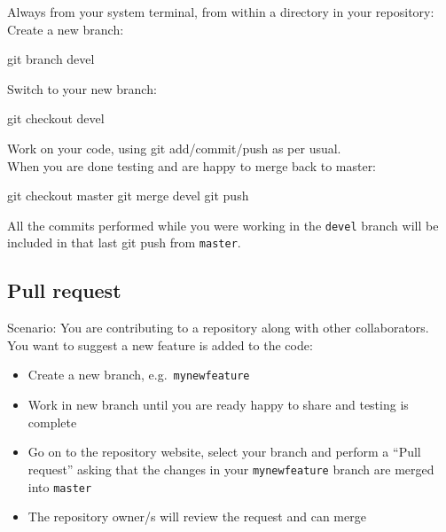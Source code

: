 \documentclass[
]{book}
\newenvironment{Shaded}{\begin{snugshade}}{\end{snugshade}}
\newcommand{\FunctionTok}[1]{\textcolor[rgb]{0.00,0.00,0.00}{#1}}
\newcommand{\NormalTok}[1]{#1}
\providecommand{\tightlist}{%
  \setlength{\itemsep}{0pt}\setlength{\parskip}{0pt}}
\begin{document}
Always from your system terminal, from within a directory in your repository:
Create a new branch:

\begin{Shaded}
\begin{Highlighting}[]
\FunctionTok{git}\NormalTok{ branch devel}
\end{Highlighting}
\end{Shaded}

Switch to your new branch:

\begin{Shaded}
\begin{Highlighting}[]
\FunctionTok{git}\NormalTok{ checkout devel}
\end{Highlighting}
\end{Shaded}

Work on your code, using git add/commit/push as per usual.\\
When you are done testing and are happy to merge back to master:

\begin{Shaded}
\begin{Highlighting}[]
\FunctionTok{git}\NormalTok{ checkout master}
\FunctionTok{git}\NormalTok{ merge devel}
\FunctionTok{git}\NormalTok{ push}
\end{Highlighting}
\end{Shaded}

All the commits performed while you were working in the \texttt{devel} branch will be included in that last git push from \texttt{master}.

\hypertarget{pull-request}{%
\subsection{Pull request}\label{pull-request}}

Scenario: You are contributing to a repository along with other collaborators. You want to suggest a new feature is added to the code:

\begin{itemize}
\tightlist
\item
  Create a new branch, e.g.~\texttt{mynewfeature}
\item
  Work in new branch until you are ready happy to share and testing is complete
\item
  Go on to the repository website, select your branch and perform a ``Pull request'' asking that the changes in your \texttt{mynewfeature} branch are merged into \texttt{master}
\item
  The repository owner/s will review the request and can merge
\end{itemize}
\end{document}
